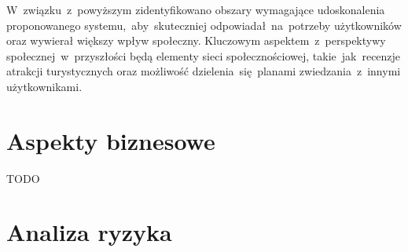 \indent W~związku~z~powyższym zidentyfikowano obszary wymagające udoskonalenia proponowanego systemu,~aby~skuteczniej odpowiadał~na~potrzeby użytkowników oraz wywierał większy wpływ społeczny.
Kluczowym aspektem~z~perspektywy społecznej~w~przyszłości będą elementy sieci społecznościowej, takie~jak~recenzje atrakcji turystycznych oraz możliwość dzielenia~się~planami zwiedzania~z~innymi użytkownikami.

\section{Aspekty biznesowe}
\label{sec:aspekty-biznesowe}

TODO

\pagebreak
\section{Analiza ryzyka}
\label{sec:analiza-ryzyka}

